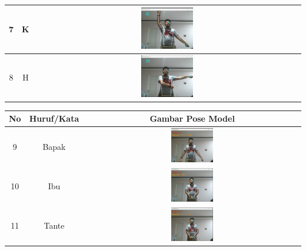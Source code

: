 \begin{table}[h]
\begin{tabular}{|c|c|c|}
	\hline
	7 & K & \includegraphics[width=0.2\textwidth]{gambar/bener/HurufK_ModelCNN_Dawe.png} \\
	\hline
	8 & H & \includegraphics[width=0.2\textwidth]{gambar/bener/HurufH_ModelCNN_Dawe.png} \\
	\hline
	\end{tabular}
	\end{table}
	

	\begin{table}[h]
		\centering
		\begin{tabular}{|c|c|c|}
			\hline
			No & Huruf/Kata & Gambar Pose Model  \\
			\hline
			9 & Bapak & \includegraphics[width=0.2\textwidth]{gambar/bener/HurufBapak_ModelCNN_Dawe.png} \\
			\hline
			10 & Ibu & \includegraphics[width=0.2\textwidth]{gambar/bener/HurufIbu_ModelCNN_Dawe.png} \\
			\hline
			11 & Tante & \includegraphics[width=0.2\textwidth]{gambar/bener/HurufTante_ModelCNN_Dawe.png} \\
			\hline
		\end{tabular}
	\end{table}
